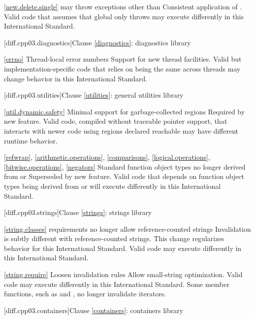 \ref{new.delete.single}
\change {} may throw exceptions other than
\rationale Consistent application of .
\effect
Valid \CppIII code that assumes that global  only
throws  may execute differently in this International
Standard.

[diff.cpp03.diagnostics]{Clause \ref{diagnostics}: diagnostics library}

\ref{errno}
\change Thread-local error numbers
\rationale Support for new thread facilities.
\effect Valid but implementation-specific \CppIII code that relies on
 being the same across threads may change behavior in this
International Standard.

[diff.cpp03.utilities]{Clause \ref{utilities}: general utilities library}

\ref{util.dynamic.safety}
\change Minimal support for garbage-collected regions
\rationale Required by new feature.
\effect
Valid \CppIII code, compiled without traceable pointer support,
that interacts with newer \Cpp code using regions declared reachable may
have different runtime behavior.

\ref{refwrap}, \ref{arithmetic.operations}, \ref{comparisons},
\ref{logical.operations}, \ref{bitwise.operations}, \ref{negators}
\change Standard function object types no longer derived from
 or 
\rationale Superseded by new feature.
\effect
Valid \CppIII code that depends on function object types being derived from
 or  will execute differently
in this International Standard.

[diff.cpp03.strings]{Clause \ref{strings}: strings library}

\ref{string.classes}
\change {} requirements no longer allow reference-counted
strings
\rationale Invalidation is subtly different with reference-counted strings.
This change regularizes behavior for this International Standard.
\effect
Valid \CppIII code may execute differently in this International Standard.

\ref{string.require}
\change Loosen  invalidation rules
\rationale Allow small-string optimization.
\effect
Valid \CppIII code may execute differently in this International Standard.
Some  member functions, such as  and ,
no longer invalidate iterators.

[diff.cpp03.containers]{Clause \ref{containers}: containers library}


